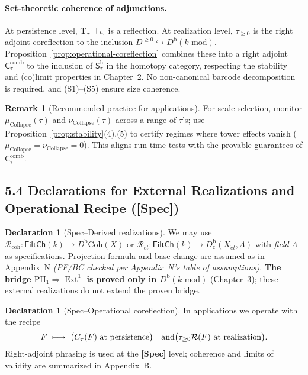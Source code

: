 \documentclass[11pt]{article}
\DeclareMathOperator{\Ext}{Ext}
\DeclareRobustCommand{\hyp}{\nobreakdash-}
\numberwithin{equation}{section}
\theoremstyle{definition}
\newtheorem{remark}[theorem]{Remark}
\newtheorem{declaration}[theorem]{Declaration}
\DeclareRobustCommand{\muc}{\mu_{\mathrm{Collapse}}}
\DeclareRobustCommand{\nuc}{\nu_{\mathrm{Collapse}}}
\providecommand{\n}{\unskip\space}
\begin{document}
\paragraph{Set\hyp theoretic coherence of adjunctions.}
At persistence level, $\mathbf{T}_\tau\dashv \iota_\tau$ is a reflection. At realization level, $\tau_{\ge 0}$ is the right adjoint coreflection to the inclusion $D^{\ge 0}\hookrightarrow D^{\mathrm{b}}(k\text{-mod})$.
Proposition~\ref{prop:operational-coreflection} combines these into a right adjoint
$\mathsf{C}_\tau^{\mathrm{comb}}$ to the inclusion of $\mathsf{S}_\tau^{\mathrm{h}}$ in the homotopy category, respecting the stability and (co)limit properties in Chapter~2. No non\hyp canonical barcode decomposition is required, and (S1)–(S5) ensure size coherence.

\begin{remark}[Recommended practice for applications]
For scale selection, monitor $\mu_{\mathrm{Collapse}}(\tau)$ and $\nu_{\mathrm{Collapse}}(\tau)$ across a range of $\tau$'s; use Proposition~\ref{prop:stability}(4),(5) to certify regimes where tower effects vanish ($\muc=\nuc=0$). This aligns run\hyp time tests with the provable guarantees of $\mathsf{C}_\tau^{\mathrm{comb}}$.
\end{remark}

\subsection*{5.4 Declarations for External Realizations and Operational Recipe (\textbf{[Spec]})}

\begin{declaration}[Spec–Derived realizations]\label{spec:derived-geo}
We may use $\mathcal{R}_{\mathrm{coh}}:\mathsf{FiltCh}(k)\to D^{\mathrm{b}}\mathrm{Coh}(X)$ or
$\mathcal{R}_{\acute{e}t}:\mathsf{FiltCh}(k)\to D^{\mathrm{b}}_{\mathrm{c}}(X_{\acute{e}t},\Lambda)$ with \emph{field} $\Lambda$ as specifications.
Projection formula and base change are assumed as in Appendix~N \emph{(PF/BC checked per Appendix~N’s table of assumptions)}.
\textbf{The bridge $\mathrm{PH}_1\Rightarrow\Ext^1$ is proved only in $D^{\mathrm{b}}(k\text{-mod})$} (Chapter~3); these external realizations do not extend the proven bridge.
\end{declaration}

\begin{declaration}[Spec–Operational coreflection]\label{spec:operational-coreflection}
In applications we operate with the recipe
\[
F\ \longmapsto\ \big(C_\tau(F)\ \text{at persistence}\big)\quad\text{and}\quad\n\big(\tau_{\ge 0}\mathcal{R}(F)\ \text{at realization}\big).
\]
Right\hyp adjoint phrasing is used at the \textbf{[Spec]} level; coherence and limits of validity are summarized in Appendix~B.
\end{declaration}
\end{document}
